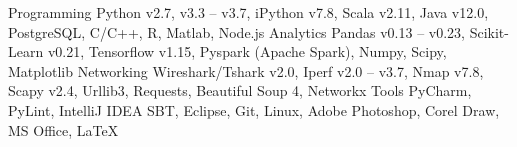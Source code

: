 

\begin{cvskills}

  \cvskill
    {Programming} %
    {Python v2.7, v3.3 -- v3.7, iPython v7.8, Scala v2.11, Java v12.0, PostgreSQL, C/C++, R, Matlab, Node.js} %
  \cvskill
    {Analytics} %
    {Pandas v0.13 -- v0.23, Scikit-Learn v0.21, Tensorflow v1.15, Pyspark (Apache Spark), Numpy, Scipy, Matplotlib} %
  \cvskill
    {Networking} %
    {Wireshark/Tshark v2.0, Iperf v2.0 -- v3.7, Nmap v7.8, Scapy v2.4, Urllib3, Requests, Beautiful Soup 4, Networkx} %
  \cvskill
    {Tools} %
    {PyCharm, PyLint, IntelliJ IDEA SBT, Eclipse, Git, Linux, Adobe Photoshop, Corel Draw, MS Office, \LaTeX}
    

\end{cvskills}


